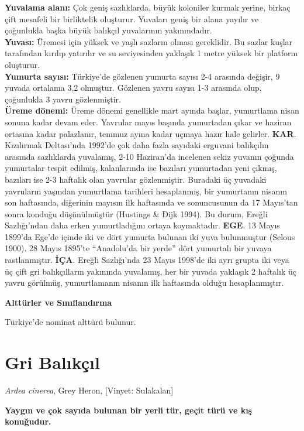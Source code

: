 \documentclass[
  letterpaper,
  DIV=11,
  numbers=noendperiod]{scrreprt}
\begin{document}
\textbf{Yuvalama alanı:} Çok geniş sazlıklarda, büyük koloniler kurmak
yerine, birkaç çift mesafeli bir birliktelik oluşturur. Yuvaları geniş
bir alana yayılır ve çoğunlukla başka büyük balıkçıl yuvalarının
yakınındadır.\\
\textbf{Yuvası:} Üremesi için yüksek ve yaşlı sazların olması
gereklidir. Bu sazlar kuşlar tarafından kırılıp yatırılır ve su
seviyesinden yaklaşık 1 metre yüksek bir platform oluşturur.\\
\textbf{Yumurta sayısı:} Türkiye'de gözlenen yumurta sayısı 2-4 arasında
değişir, 9 yuvada ortalama 3,2 olmuştur. Gözlenen yavru sayısı 1-3
arasında olup, çoğunlukla 3 yavru gözlenmiştir.\\
\textbf{Üreme dönemi:} Üreme dönemi genellikle mart ayında başlar,
yumurtlama nisan sonuna kadar devam eder. Yavrular mayıs başında
yumurtadan çıkar ve haziran ortasına kadar palazlanır, temmuz ayına
kadar uçmaya hazır hale gelirler. \textbf{KAR}. Kızılırmak Deltası'nda
1992'de çok daha fazla sayıdaki erguvani balıkçılın arasında sazlıklarda
yuvalamış, 2-10 Haziran'da incelenen sekiz yuvanın çoğunda yumurtalar
tespit edilmiş, kalanlarında ise bazıları yumurtadan yeni çıkmış,
bazıları ise 2-3 haftalık olan yavrular gözlenmiştir. Buradaki üç
yuvadaki yavruların yaşından yumurtlama tarihleri hesaplanmış, bir
yumurtanın nisanın son haftasında, diğerinin mayısın ilk haftasında ve
sonuncusunun da 17 Mayıs'tan sonra konduğu düşünülmüştür (Hustings \&
Dijk 1994). Bu durum, Ereğli Sazlığı'ndan daha erken yumurtladığını
ortaya koymaktadır. \textbf{EGE}. 13 Mayıs 1899'da Ege'de içinde iki ve
dört yumurta bulunan iki yuva bulunmuştur (Selous 1900). 28 Mayıs
1895'te ``Anadolu'da bir yerde'' dört yumurtalı bir yuvaya
rastlanmıştır. \textbf{İÇA}. Ereğli Sazlığı'nda 23 Mayıs 1998'de iki
ayrı grupta iki veya üç çift gri balıkçılların yakınında yuvalamış, her
bir yuvada yaklaşık 2 haftalık üç yavru görülmüş, yumurtlamanın nisanın
ilk haftasında olduğu hesaplanmıştır.

\textbf{Alttürler ve Sınıflandırma}

Türkiye'de nominat alttürü bulunur.

\section{Gri Balıkçıl}\label{gri-balux131kuxe7ux131l}

\emph{Ardea cinerea}, Grey Heron, {[}Vinyet: Sulakalan{]}

\textbf{Yaygın ve çok sayıda bulunan bir yerli tür, geçit türü ve kış
konuğudur.}
\end{document}
